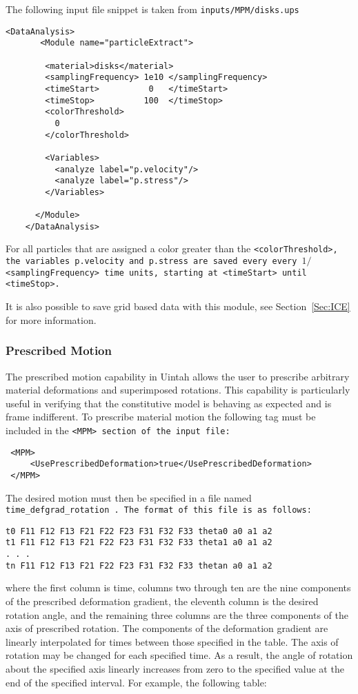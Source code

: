 The following input file snippet is taken from
\tt inputs/MPM/disks.ups \normalfont  
\begin{Verbatim}[fontsize=\footnotesize]
    <DataAnalysis>
       <Module name="particleExtract">

        <material>disks</material>
        <samplingFrequency> 1e10 </samplingFrequency>
        <timeStart>          0   </timeStart>
        <timeStop>          100  </timeStop>
        <colorThreshold>
          0
        </colorThreshold>

        <Variables>
          <analyze label="p.velocity"/>
          <analyze label="p.stress"/>
        </Variables>

      </Module>
    </DataAnalysis>
\end{Verbatim}

For all particles that are assigned a color greater than the
\tt <colorThreshold>, \normalfont the variables
\tt p.velocity \normalfont and
\tt p.stress \normalfont are saved every every
$1/$\tt <samplingFrequency> \normalfont time units, starting at
\tt <timeStart> \normalfont until
\tt <timeStop>. \normalfont

It is also possible to save grid based data with this module,
see Section~\ref{Sec:ICE} for more information.

\subsubsection{Prescribed Motion} \label{PrescribedMotion} The prescribed motion
capability in Uintah allows the user to prescribe arbitrary material
deformations and superimposed rotations.  This capability is particularly
useful in verifying that the constitutive model is behaving as expected and is
frame indifferent.  To prescribe material motion the following tag must be
included in the \tt <MPM> \normalfont section of the input file:

\begin{Verbatim}
 <MPM>
     <UsePrescribedDeformation>true</UsePrescribedDeformation>
 </MPM>
\end{Verbatim}

The desired motion must then be specified in a file named \tt time\_defgrad\_rotation \normalfont.  The format of this file is as follows:

\begin{Verbatim}
t0 F11 F12 F13 F21 F22 F23 F31 F32 F33 theta0 a0 a1 a2
t1 F11 F12 F13 F21 F22 F23 F31 F32 F33 theta1 a0 a1 a2
. . .
tn F11 F12 F13 F21 F22 F23 F31 F32 F33 thetan a0 a1 a2

\end{Verbatim}
where the first column is time, columns two through ten are the nine components of the prescribed deformation gradient, the eleventh column is the desired rotation angle, and the remaining three columns are the three components of the axis of prescribed rotation.  The components of the deformation gradient are linearly interpolated for times between those specified in the table.  The axis of rotation may be changed for each specified time.  As a result, the angle of rotation about the specified axis linearly increases from zero to the specified value at the end of the specified interval.  For example, the following table:

